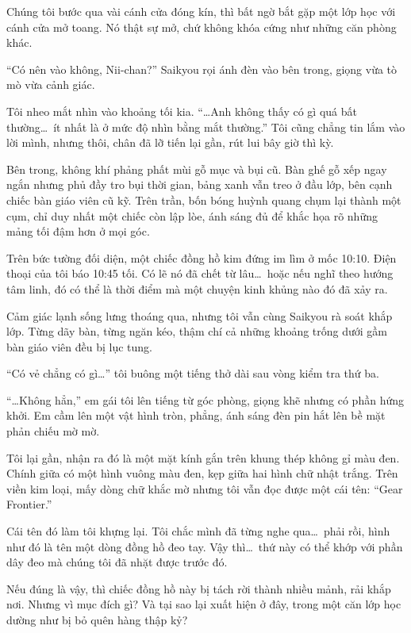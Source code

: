 \documentclass[../main.tex]{subfiles}
\begin{document}
Chúng tôi bước qua vài cánh cửa đóng kín, thì bất ngờ bắt gặp một lớp học với cánh cửa mở toang. Nó thật sự mở, chứ không khóa cứng như những căn phòng khác.

``Có nên vào không, Nii-chan?'' Saikyou rọi ánh đèn vào bên trong, giọng vừa tò mò vừa cảnh giác.

Tôi nheo mắt nhìn vào khoảng tối kia. ``\dots Anh không thấy có gì quá bất thường\dots\ ít nhất là ở mức độ nhìn bằng mắt thường.'' Tôi cũng chẳng tin lắm vào lời mình, nhưng thôi, chân đã lỡ tiến lại gần, rút lui bây giờ thì kỳ.

Bên trong, không khí phảng phất mùi gỗ mục và bụi cũ. Bàn ghế gỗ xếp ngay ngắn nhưng phủ đầy tro bụi thời gian, bảng xanh vẫn treo ở đầu lớp, bên cạnh chiếc bàn giáo viên cũ kỹ. Trên trần, bốn bóng huỳnh quang chụm lại thành một cụm, chỉ duy nhất một chiếc còn lập lòe, ánh sáng đủ để khắc họa rõ những mảng tối đậm hơn ở mọi góc.


Trên bức tường đối diện, một chiếc đồng hồ kim đứng im lìm ở mốc 10:10. Điện thoại của tôi báo 10:45 tối. Có lẽ nó đã chết từ lâu\dots\ hoặc nếu nghĩ theo hướng tâm linh, đó có thể là thời điểm mà một chuyện kinh khủng nào đó đã xảy ra.

Cảm giác lạnh sống lưng thoáng qua, nhưng tôi vẫn cùng Saikyou rà soát khắp lớp. Từng dãy bàn, từng ngăn kéo, thậm chí cả những khoảng trống dưới gầm bàn giáo viên đều bị lục tung.

``Có vẻ chẳng có gì\dots'' tôi buông một tiếng thở dài sau vòng kiểm tra thứ ba.

``\dots Không hẳn,'' em gái tôi lên tiếng từ góc phòng, giọng khẽ nhưng có phần hứng khởi. Em cầm lên một vật hình tròn, phẳng, ánh sáng đèn pin hắt lên bề mặt phản chiếu mờ mờ.

Tôi lại gần, nhận ra đó là một mặt kính gắn trên khung thép không gỉ màu đen. Chính giữa có một hình vuông màu đen, kẹp giữa hai hình chữ nhật trắng. Trên viền kim loại, mấy dòng chữ khắc mờ nhưng tôi vẫn đọc được một cái tên: ``Gear Frontier.''

Cái tên đó làm tôi khựng lại. Tôi chắc mình đã từng nghe qua\dots\ phải rồi, hình như đó là tên một dòng đồng hồ đeo tay. Vậy thì\dots\ thứ này có thể khớp với phần dây đeo mà chúng tôi đã nhặt được trước đó.

Nếu đúng là vậy, thì chiếc đồng hồ này bị tách rời thành nhiều mảnh, rải khắp nơi. Nhưng vì mục đích gì? Và tại sao lại xuất hiện ở đây, trong một căn lớp học dường như bị bỏ quên hàng thập kỷ?
\end{document}
